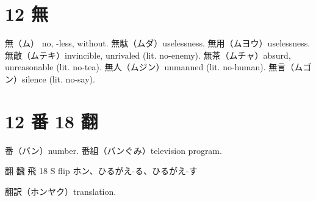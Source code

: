 \section{12 無}

無（ム） no, -less, without.
無駄（ムダ）uselessness.
無用（ムヨウ）uselessness.
無敵（ムテキ）invincible, unrivaled (lit. no-enemy).
無茶（ムチャ）absurd, unreasonable (lit. no-tea).
無人（ムジン）unmanned (lit. no-human).
無言（ムゴン）silence (lit. no-say).

\section{12 番 18 翻}

番（バン）number.
番組（バンぐみ）television program.

翻 飜 飛 18 S  flip ホン、ひるがえ-る、ひるがえ-す

翻訳（ホンヤク）translation.
